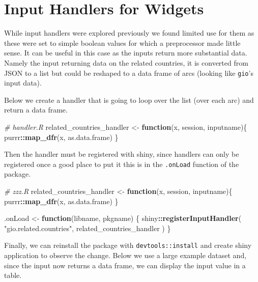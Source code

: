 \documentclass[
]{krantz}
\makeatletter
\newenvironment{Shaded}{\begin{snugshade}}{\end{snugshade}}
\newcommand{\CommentTok}[1]{\textcolor[rgb]{0.37,0.37,0.37}{\textit{#1}}}
\newcommand{\ControlFlowTok}[1]{\textcolor[rgb]{0.27,0.27,0.27}{\textbf{#1}}}
\newcommand{\KeywordTok}[1]{\textcolor[rgb]{0.27,0.27,0.27}{\textbf{#1}}}
\newcommand{\NormalTok}[1]{#1}
\newcommand{\OperatorTok}[1]{\textcolor[rgb]{0.43,0.43,0.43}{\textbf{#1}}}
\newcommand{\StringTok}[1]{\textcolor[rgb]{0.5,0.5,0.5}{#1}}
\newenvironment{kframe}{%
\medskip{}
\setlength{\fboxsep}{.8em}
 \def\at@end@of@kframe{}%
 \ifinner\ifhmode%
  \def\at@end@of@kframe{\end{minipage}}%
  \begin{minipage}{\columnwidth}%
 \fi\fi%
 \def\FrameCommand##1{\hskip\@totalleftmargin \hskip-\fboxsep
 \colorbox{shadecolor}{##1}\hskip-\fboxsep
     \hskip-\linewidth \hskip-\@totalleftmargin \hskip\columnwidth}%
 \MakeFramed {\advance\hsize-\width
   \@totalleftmargin\z@ \linewidth\hsize
   \@setminipage}}%
 {\par\unskip\endMakeFramed%
 \at@end@of@kframe}
\renewenvironment{Shaded}{\begin{kframe}}{\end{kframe}}
\makeatother
\begin{document}
\hypertarget{shiny-widgets-handlers}{%
\section{Input Handlers for Widgets}\label{shiny-widgets-handlers}}

While input handlers were explored previously we found limited use for them as these were set to simple boolean values for which a preprocessor made little sense. It can be useful in this case as the inputs return more substantial data. Namely the input returning data on the related countries, it is converted from JSON to a list but could be reshaped to a data frame of arcs (looking like \texttt{gio}'s input data).

Below we create a handler that is going to loop over the list (over each arc) and return a data frame.

\begin{Shaded}
\begin{Highlighting}[]
\CommentTok{\# handler.R}
\NormalTok{related\_countries\_handler <{-}}\StringTok{ }\ControlFlowTok{function}\NormalTok{(x, session, inputname)\{}
\NormalTok{  purrr}\OperatorTok{::}\KeywordTok{map\_dfr}\NormalTok{(x, as.data.frame)}
\NormalTok{\}}
\end{Highlighting}
\end{Shaded}

Then the handler must be registered with shiny, since handlers can only be registered once a good place to put it this is in the \texttt{.onLoad} function of the package.

\begin{Shaded}
\begin{Highlighting}[]
\CommentTok{\# zzz.R}
\NormalTok{related\_countries\_handler <{-}}\StringTok{ }\ControlFlowTok{function}\NormalTok{(x, session, inputname)\{}
\NormalTok{  purrr}\OperatorTok{::}\KeywordTok{map\_dfr}\NormalTok{(x, as.data.frame)}
\NormalTok{\}}

\NormalTok{.onLoad <{-}}\StringTok{ }\ControlFlowTok{function}\NormalTok{(libname, pkgname) \{}
\NormalTok{  shiny}\OperatorTok{::}\KeywordTok{registerInputHandler}\NormalTok{(}
    \StringTok{"gio.related.countries"}\NormalTok{, }
\NormalTok{    related\_countries\_handler}
\NormalTok{  )}
\NormalTok{\}}
\end{Highlighting}
\end{Shaded}

Finally, we can reinstall the package with \texttt{devtools::install} and create shiny application to observe the change. Below we use a large example dataset and, since the input now returns a data frame, we can display the input value in a table.
\end{document}
